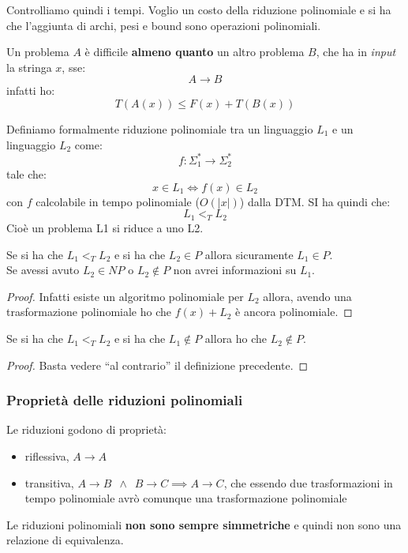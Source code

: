 Controlliamo quindi i tempi. Voglio un costo della riduzione polinomiale e si ha
che l'aggiunta di archi, pesi e bound sono operazioni polinomiali.
\begin{definizione}
 Un problema $A$ è difficile \textbf{almeno quanto} un altro problema $B$, che ha in \textit{input} la stringa
  $x$, sse:
  \[A\to B\]
  infatti ho:
  \[T(A(x))\leq F(x)+T(B(x))\]
\end{definizione}
\begin{definizione}
  Definiamo formalmente riduzione polinomiale tra un linguaggio $L_1$ e un
  linguaggio $L_2$ come:
  \[f:\Sigma_1^*\to \Sigma_2^*\]
  tale che:
  \[x\in L_1\iff f(x)\in L_2\]
  con $f$ calcolabile in tempo polinomiale ($O(|x|)$) dalla DTM. SI ha quindi
  che:
  \[L_1<_T L_2\]
  Cioè un problema L1 si riduce a uno L2.
\end{definizione}
\begin{definizione}
  Se si ha che $L_1<_T L_2$ e si ha che $L_2\in P$ allora sicuramente $L_1\in
  P$.\\
  Se avessi avuto $L_2\in NP$ o $L_2\not\in P$ non avrei informazioni su $L_1$. 

\end{definizione}
\begin{proof}
  Infatti esiste un algoritmo polinomiale per $L_2$ allora, avendo una
  trasformazione polinomiale  ho che $f(x)+L_2$ è ancora polinomiale.
\end{proof}
\begin{definizione}
  Se si ha che $L_1<_T L_2$ e si ha che $L_1\not\in P$ allora ho che
  $L_2\not\in P$.
\end{definizione}
\begin{proof}
  Basta vedere ``al contrario'' il definizione precedente.
\end{proof}
\subsubsection{Proprietà delle riduzioni polinomiali}
Le riduzioni godono di proprietà:
\begin{itemize}
  \item riflessiva, $A\to A$
  \item transitiva, $A\to B\,\,\,\land \,\,\,B\to C\implies A\to C$, che essendo
  due trasformazioni in tempo polinomiale avrò comunque una trasformazione
  polinomiale 
\end{itemize}
Le riduzioni polinomiali \textbf{non sono sempre simmetriche} e quindi non sono
una relazione di equivalenza.\\
